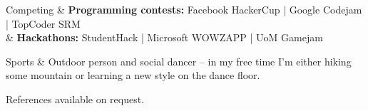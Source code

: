 \documentclass[11pt,a4paper]{article}
\begin{document}
  \begin{tabu}{}
    Competing
      & \textbf{Programming contests:} Facebook HackerCup | Google Codejam | TopCoder SRM\\
      & \textbf{Hackathons:} StudentHack | Microsoft WOWZAPP | UoM Gamejam \\
  \end{tabu}

  \begin{tabu}{}
    Sports
      & Outdoor person and social dancer -- in my free time I'm either hiking some mountain or learning a new style on the dance floor.\\
  \end{tabu}

\vspace{1em}
References available on request.
\end{document}
